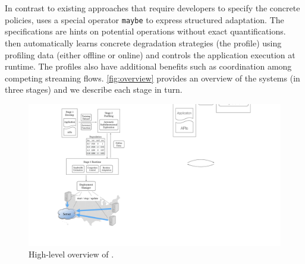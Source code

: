 \section{\sysname{}}
\label{sec:system}

In contrast to existing approaches that require developers to specify the
concrete policies, \sysname{} uses a special operator \texttt{maybe} to express
structured adaptation. The specifications are hints on potential operations
without exact quantifications. \sysname{} then automatically learns concrete
degradation strategies (the profile) using profiling data (either offline or
online) and controls the application execution at runtime. The profiles also
have additional benefits such as coordination among competing streaming
flows. \autoref{fig:overview} provides an overview of the systems (in three
stages) and we describe each stage in turn.

\begin{figure}
  \centering
  \includegraphics[width=.9\linewidth]{figures/system.pdf}
  \caption{High-level overview of \sysname{}.}
  \label{fig:overview}
\end{figure}






